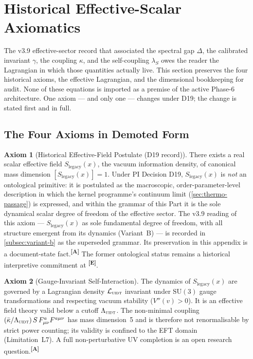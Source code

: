\documentclass[12pt,a4paper,twoside]{article}
\theoremstyle{plain}
\theoremstyle{definition}
\newtheorem{axiom}{Axiom}
\theoremstyle{remark}
\newcommand{\UIDT}{\textsc{uidt}} %
\newcommand{\catmark}[1]{\textsuperscript{\textsf{\textbf{[#1]}}}}
\newcommand{\LegacySx}{S_{\mathrm{legacy}}(x)} %
\begin{document}
\section{Historical Effective-Scalar Axiomatics}
\label{sec:axiomatics}
\label{app:scalar-museum}

\noindent The v3.9 effective-sector record that associated the spectral gap $\Delta$, the
calibrated invariant $\gamma$, the coupling $\kappa$, and the
self-coupling $\lambda_S$ owes the reader the Lagrangian in which those
quantities actually live. This section preserves the four historical axioms, the effective
Lagrangian, and the dimensional bookkeeping for audit. None of these equations
is imported as a premise of the active Phase-6 architecture.
One axiom --- and only one --- changes under D19; the change is stated
first and in full.

\subsection{The Four Axioms in Demoted Form}
\label{subsec:four-axioms}

\begin{axiom}[Historical Effective-Field Postulate (D19 record)]
\label{ax:primacy}
There exists a real scalar effective field $\LegacySx$, the vacuum information
density, of canonical mass dimension $[\LegacySx]=1$. Under PI Decision D19, $\LegacySx$ is \emph{not} an ontological primitive: it is postulated
as the macroscopic, order-parameter-level description in which the
kernel programme's continuum limit (\cref{sec:thermo-passage}) is
expressed, and within the grammar of this Part it is the sole dynamical
scalar degree of freedom of the effective sector. The v3.9 reading of
this axiom --- $\LegacySx$ as sole fundamental degree of freedom, with all
structure emergent from its dynamics (Variant~B) --- is recorded in
\cref{subsec:variant-b} as the superseded grammar. Its preservation in this
appendix is a document-state fact.\catmark{A} The former ontological status
remains a historical interpretive commitment at \catmark{E}.
\end{axiom}

\begin{axiom}[Gauge-Invariant Self-Interaction]
\label{ax:gauge}
The dynamics of $\LegacySx$ are governed by a Lagrangian density
$\mathcal{L}_{\UIDT}$ invariant under $\mathrm{SU}(3)$ gauge
transformations and respecting vacuum stability ($V''(v)>0$). It is an
effective field theory valid below a cutoff $\Lambda_{\UIDT}$. The
non-minimal coupling
$(\bar\kappa/\Lambda_{\UIDT})\,S\,F_{\mu\nu}^a F^{a\mu\nu}$ has mass
dimension~5 and is therefore not renormalisable by strict power
counting; its validity is confined to the EFT domain (Limitation~L7). A
full non-perturbative UV completion is an open research
question.\catmark{A}
\end{axiom}
\end{document}
